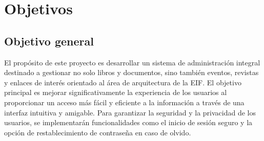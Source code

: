 \documentclass[a4paper, 12pt]{book}
\begin{document}
\chapter{Objetivos} %
\label{chap:objetivos} %

\section{Objetivo general} %
\label{sec:objetivo-general} %
El propósito de este proyecto es desarrollar un sistema de administración integral destinado a gestionar no solo libros y documentos, sino también eventos, revistas y enlaces de interés orientado al área de arquitectura de la EIF. El objetivo principal es mejorar significativamente la experiencia de los usuarios al proporcionar un acceso más fácil y eficiente a la información a través de una interfaz intuitiva y amigable. Para garantizar la seguridad y la privacidad de los usuarios, se implementarán funcionalidades como el inicio de sesión seguro y la opción de restablecimiento de contraseña en caso de olvido.
\end{document}
